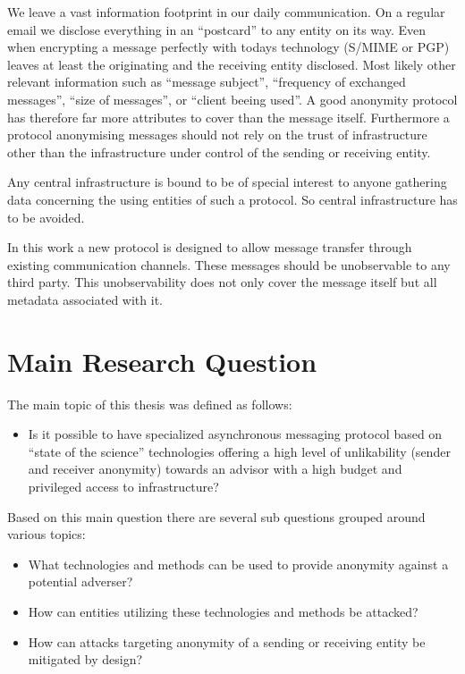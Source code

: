We leave a vast information footprint in our daily communication. On a regular email we disclose everything in an ``postcard'' to any entity on its way. Even when encrypting a message perfectly with todays technology (S/MIME\cite{RFC2045} or PGP\cite{RFC2015}) leaves at least the originating and the receiving entity disclosed. Most likely other relevant information such as ``message subject'', ``frequency of exchanged messages'', ``size of messages'', or ``client beeing used''. A good anonymity protocol has therefore far more attributes to cover than the message itself. Furthermore a protocol anonymising messages should not rely on the trust of infrastructure other than the infrastructure under control of the sending or receiving entity. 

Any central infrastructure is bound to be of special interest to anyone gathering data concerning the using entities of such a protocol. So central infrastructure has to be avoided.

In this work a new protocol is designed to allow message transfer through existing communication channels. These messages should be unobservable to any third party. This unobservability does not only cover the message itself but all metadata associated with it. 

\chapter{Main Research Question}
The main topic of this thesis was defined as follows:
\begin{itemize}
	\item Is it possible to have specialized asynchronous messaging protocol based on ``state of the science'' technologies offering a high level of unlikability (sender and receiver anonymity) towards an advisor with a high budget and privileged access to infrastructure?
\end{itemize}

Based on this main question there are several sub questions grouped around various topics:

\begin{itemize}
	\item What technologies and methods can be used to provide anonymity against a potential adverser?
	\item How can entities utilizing these technologies and methods be attacked?
	\item How can attacks targeting anonymity of a sending or receiving entity be mitigated by design?
\end{itemize}

